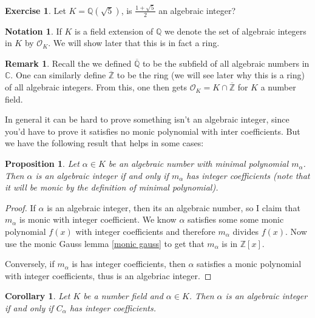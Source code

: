 \documentclass[11pt,a4paper]{report}
\theoremstyle{plain}
\newtheorem{cor}[subsection]{Corollary}
\newtheorem{prop}[subsection]{Proposition}
\theoremstyle{definition}
\theoremstyle{definition}
\newtheorem{rmrk}[subsection]{Remark}
\newtheorem{nota}[subsection]{Notation}
\newtheorem{question}[subsection]{Exercise}
\newcommand{\ZZ}{\mathbb{Z}}
\def\CC{\mathbb{C}}
\def\QQ{\mathbb{Q}}
\def \a{\alpha}
\def \OO {\mathcal{O}}
\def \ov{\overline}
\begin{document}
	\begin{question}
		Let $K=\QQ(\sqrt{5})$, is $\frac{1+\sqrt{5}}{2}$ an algebraic integer?
	\end{question}
	
	\begin{nota}
		If $K$ is a field extension of $\QQ$ we denote the set of algebraic integers in $K$ by $\OO_K$. We will show later that this is in fact a ring. 
	\end{nota}
	
	\begin{rmrk}\label{rmrk: all alg ints}
		Recall the we defined $\ov{\QQ}$ to be the subfield of all algebraic numbers in $\CC$. One can similarly define $\ov{\ZZ}$ to be the ring (we will see later why this is a ring) of all algebraic integers. From this, one then gets $\OO_K=K \cap \ov{\ZZ}$ for $K$ a number field.
	\end{rmrk}
	
	In general it can be hard to prove something isn't an algebraic integer, since you'd have to prove it satisfies no monic polynomial with inter coefficients. But we have the following result that helps in some cases:
	
	\begin{prop}\label{prop: min pol alg int}
		Let $\a \in K$ be an algebraic number with minimal polynomial $m_\a$. Then $\a$ is an algebraic integer if and only if $m_{\a}$ has integer coefficients (note that it will be monic by the definition of minimal polynomial).
	\end{prop}
	
	\begin{proof}
		If $\a$ is an algebraic integer, then its an algebraic number, so I claim that $m_\a$ is monic with integer coefficient. We know $\a$ satisfies some some monic polynomial $f(x)$ with integer coefficients and therefore $m_\a$ divides $f(x)$. Now use the monic Gauss lemma \ref{monic gauss} to get that $m_\a$ is in $\ZZ[x]$.
		
		
		
		Conversely, if $m_\a$ is has integer coefficients, then $\a$ satisfies a monic polynomial with integer coefficients, thus is an algebriac integer.
	\end{proof}
	
	
	\begin{cor}\label{cor: field pol of alg int has int coefs}
		Let $K$ be a number field and $\a \in K$. Then $\a$ is an algebraic integer if and only if $C_\a$ has integer coefficients.
	\end{cor}
	
\end{document}
